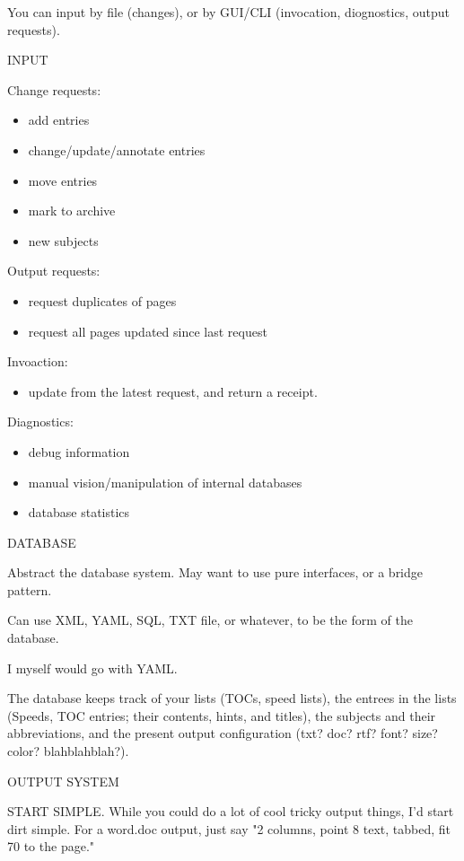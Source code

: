 \documentclass[oneside]{book}
\begin{document}
You can input by file (changes), or by GUI/CLI (invocation,
diognostics, output requests).


INPUT

Change requests:
\begin{itemize}
\item add entries
\item change/update/annotate entries
\item move entries
\item mark to archive
\item new subjects
\end{itemize}

Output requests:
\begin{itemize}
\item request duplicates of pages
\item request all pages updated since last request
\end{itemize}

Invoaction:
\begin{itemize}
\item update from the latest request, and return a receipt.
\end{itemize}

Diagnostics:
\begin{itemize}
\item debug information
\item manual vision/manipulation of internal databases
\item database statistics
\end{itemize}


DATABASE

Abstract the database system.
May want to use pure interfaces, or a bridge pattern.

Can use XML, YAML, SQL, TXT file, or whatever, to be the form of the
database.

I myself would go with YAML.

The database keeps track of your lists (TOCs, speed lists), the
entrees in the lists (Speeds, TOC entries; their contents, hints, and
titles), the subjects and their abbreviations, and the present output
configuration (txt? doc? rtf? font? size? color? blahblahblah?).


OUTPUT SYSTEM

START SIMPLE. While you could do a lot of cool tricky output things,
I'd start dirt simple. For a word.doc output, just say "2 columns,
point 8 text, tabbed, fit 70 to the page."
\end{document}
